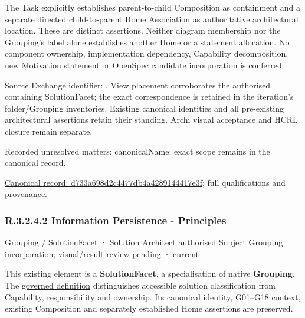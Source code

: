 The Task explicitly establishes parent-to-child Composition as containment and
a separate directed child-to-parent Home Association as authoritative architectural
location. These are distinct assertions. Neither diagram membership nor the
Grouping's label alone establishes another Home or a statement allocation.
No component ownership, implementation dependency, Capability decomposition,
new Motivation statement or OpenSpec candidate incorporation is conferred.



Source Exchange identifier: \texttt{}. View placement corroborates
the authorised containing SolutionFacet; the exact correspondence is retained in the
iteration's folder/Grouping inventories. Existing canonical identities and all
pre-existing architectural assertions retain their standing. Archi visual
acceptance and HCRL closure remain separate.


{\small Recorded unresolved matters: canonicalName; exact scope remains in the canonical record.}\par
{\footnotesize \href{../../../../../../../continuum/grouping/d733a698d2c4477db4a4289144417e3f.md}{Canonical record: d733a698d2c4477db4a4289144417e3f}; full qualifications and provenance.}\par
\subsubsection*{R.3.2.4.2 Information Persistence - Principles}
\label{navigation:R.3.2.4.2}

\label{element:a5228e483703437ba7617034e4ea207f}
{\small Grouping / SolutionFacet · Solution Architect authorised Subject Grouping incorporation; visual/result review pending · current}\par

This existing element is a \textbf{SolutionFacet}, a specialisation of native
\textbf{Grouping}. The \href{\detokenize{../../../../../../../governance/continuum-representation.md#solutionfacet-classification--1119-candidate}}{governed definition}
distinguishes accessible solution classification from Capability, responsibility
and ownership. Its canonical identity, G01–G18 context, existing Composition
and separately established Home assertions are preserved.



